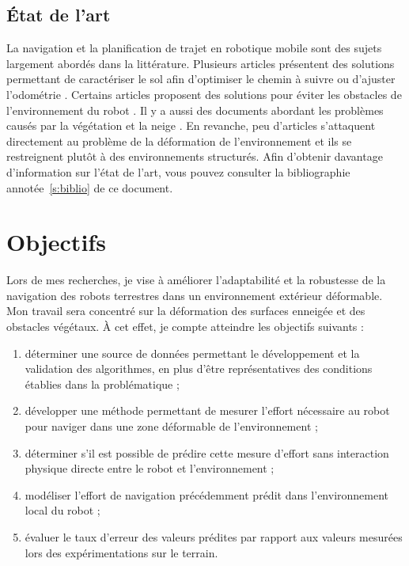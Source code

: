 \documentclass[12pt, letterpaper]{article} %
\begin{document}
\subsection{État de l'art}
La navigation et la planification de trajet en robotique mobile sont des sujets largement abordés dans la littérature. Plusieurs articles présentent des solutions permettant de caractériser le sol afin d'optimiser le chemin à suivre \cite{Brooks2012} ou d'ajuster l'odométrie \cite{Reinstein2013}. Certains articles proposent des solutions pour éviter les obstacles de l'environnement du robot \cite{Heidarsson2011} \cite{Lalonde2006} \cite{Sinha2013}. Il y a aussi des documents abordant les problèmes causés par la végétation \cite{Haselich2012} \cite{Laible2013} et la neige \cite{Boyraz2013} \cite{Trautmann2011}. En revanche, peu d'articles s'attaquent directement au problème de la déformation de l'environnement \cite{Frank2011} \cite{Frank2009} \cite{Ho2013} et ils se restreignent plutôt à des environnements structurés. Afin d'obtenir davantage d'information sur l'état de l'art, vous pouvez consulter la bibliographie annotée~\ref{s:biblio} de ce document.

\section{Objectifs}
\label{s:objectifs}
Lors de mes recherches, je vise à améliorer l'adaptabilité et la robustesse de la navigation des robots terrestres dans un environnement extérieur déformable. Mon travail sera concentré sur la déformation des surfaces enneigée et des obstacles végétaux. À cet effet, je compte atteindre les objectifs suivants :
\begin{enumerate}
\item déterminer une source de données permettant le développement et la validation des algorithmes, en plus d'être représentatives des conditions établies dans la problématique ;
\item développer une méthode permettant de mesurer l'effort nécessaire au robot pour naviger dans une zone déformable de l'environnement ; 
\item déterminer s'il est possible de prédire cette mesure d'effort sans interaction physique directe entre le robot et l'environnement ;
\item modéliser l'effort de navigation précédemment prédit dans l'environnement local du robot ;
\item évaluer le taux d'erreur des valeurs prédites par rapport aux valeurs mesurées lors des expérimentations sur le terrain.
\end{enumerate}
\end{document}
